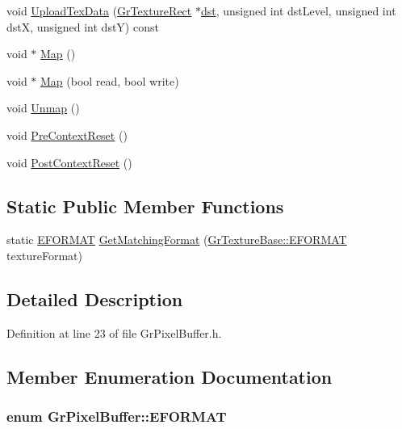 \begin{CompactItemize}
\begin{CompactItemize}
\item 
void \hyperlink{class_gr_pixel_buffer_f6ff86a7e14c75e5ac8176954122df28}{UploadTexData} (\hyperlink{class_gr_texture_rect}{GrTextureRect} $\ast$\hyperlink{glext__bak_8h_92034251bfd455d524a9b5610cddba00}{dst}, unsigned int dstLevel, unsigned int dstX, unsigned int dstY) const 
\item 
void $\ast$ \hyperlink{class_gr_pixel_buffer_9c3e8ac0a0ffb59a657d7abb458a2a89}{Map} ()
\item 
void $\ast$ \hyperlink{class_gr_pixel_buffer_114b4356b7c8aa5fa2d301d91e457f0d}{Map} (bool read, bool write)
\item 
void \hyperlink{class_gr_pixel_buffer_27f30af3f42bf6f84e4ae3b5f6f26d60}{Unmap} ()
\item 
void \hyperlink{class_gr_pixel_buffer_13acc2beb0f889e2706416362937412b}{PreContextReset} ()
\item 
void \hyperlink{class_gr_pixel_buffer_7fb50727fb5183b68760aae61fb658cb}{PostContextReset} ()
\end{CompactItemize}
\subsection*{Static Public Member Functions}
\begin{CompactItemize}
\item 
static \hyperlink{class_gr_pixel_buffer_f9df985b34eb04e3465c776a8e9d7cbe}{EFORMAT} \hyperlink{class_gr_pixel_buffer_ebc2dc93c5179b6d41160bb89247dfed}{GetMatchingFormat} (\hyperlink{class_gr_texture_base_82c606022e93566ba55fe4cd3beb687c}{GrTextureBase::EFORMAT} textureFormat)
\end{CompactItemize}


\subsection{Detailed Description}


Definition at line 23 of file GrPixelBuffer.h.

\subsection{Member Enumeration Documentation}
\hypertarget{class_gr_pixel_buffer_f9df985b34eb04e3465c776a8e9d7cbe}{
\subsubsection[{EFORMAT}]{\setlength{\rightskip}{0pt plus 5cm}enum {\bf GrPixelBuffer::EFORMAT}}}
\label{class_gr_pixel_buffer_f9df985b34eb04e3465c776a8e9d7cbe}



\end{CompactItemize}
